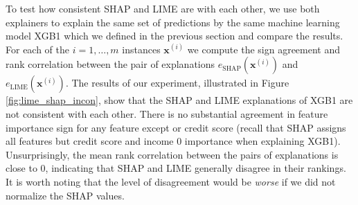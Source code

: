 \documentclass[mnsc,blindrev]{informs3}
\begin{document}
                To test how consistent SHAP and LIME are with each other, we use both explainers to explain the same set of predictions by the same machine learning model XGB1 which we defined in the previous section and compare the results. For each of the $i=1,\ldots,m$ instances $\mathbf{x}^{(i)}$ we compute the sign agreement and rank correlation between the pair of explanations $e_\text{SHAP}(\mathbf{x}^{(i)})$ and $e_\text{LIME}(\mathbf{x}^{(i)})$. The results of our experiment, illustrated in Figure \ref{fig:lime_shap_incon}, show that the SHAP and LIME explanations of XGB1 are not consistent with each other. There is no substantial agreement in feature importance sign for any feature except or credit score (recall that SHAP assigns all features but credit score and income 0 importance when explaining XGB1). Unsurprisingly, the mean rank correlation between the pairs of explanations is close to 0, indicating that SHAP and LIME generally disagree in their rankings. It is worth noting that the level of disagreement would be \emph{worse} if we did not normalize the SHAP values. 
                
            
                
\end{document}
